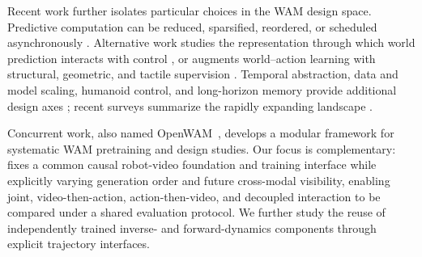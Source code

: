 Recent work further isolates particular choices in the WAM design space.
Predictive computation can be reduced, sparsified, reordered, or scheduled
asynchronously
\cite{yuan2026fast, tang2026world, wang2026glancewam,
ye2603gigaworld, li2026light, huang2026streaming,
huang2026noisegate, pan2026selfwam}. Alternative work studies the
representation through which world prediction interacts with control
\cite{liu2026oa, wang2026repwam, qiu2026making, zhao2026sg,
shen2026ld4wam, you2026affordancewam, jiang2026rethinking}, or augments
world--action learning with structural, geometric, and tactile supervision
\cite{zheng2026gift, gonzalez2026spatially, ma2026tacpac}. Temporal
abstraction, data and model scaling, humanoid control, and long-horizon memory
provide additional design axes
\cite{li2026wall, liu2026ge, zheng2026motionwam, zhao2026memory};
recent surveys summarize the rapidly expanding landscape
\cite{wang2026world, lu2026world}.

Concurrent work, also named OpenWAM~\cite{wang2026openwam}, develops a modular
framework for systematic WAM pretraining and design studies. Our focus is
complementary: \ours fixes a common causal robot-video foundation and training
interface while explicitly varying generation order and future cross-modal
visibility, enabling joint, video-then-action, action-then-video, and decoupled
interaction to be compared under a shared evaluation protocol. We further study
the reuse of independently trained inverse- and forward-dynamics components
through explicit trajectory interfaces.




